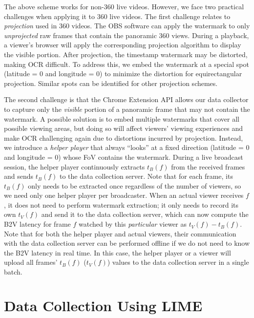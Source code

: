 The above scheme works for non-360\degree{} live videos. However,
we face two practical challenges when applying it to 360\degree{} live videos.
The first challenge relates to \emph{projection} used in 360\degree{} videos.
The OBS software can apply the watermark to only \emph{unprojected}
raw frames that contain the panoramic 360\degree{} views. During a playback,
a viewer's browser will apply the corresponding projection algorithm to display the visible portion. After projection, the timestamp watermark may be distorted, making OCR difficult.
%
To address this, we embed the watermark at a special spot (latitude = 0\degree{} and longitude = 0\degree{}) to minimize the distortion for equirectangular projection. Similar spots can be identified for other projection schemes.

The second challenge is that the Chrome Extension API allows our data collector to capture only the \emph{visible} portion of a panoramic frame that may not contain the watermark. A possible solution is to embed multiple watermarks that cover all possible viewing areas, but doing so will affect viewers' viewing experiences and make OCR challenging again due to distortions incurred by projection.
%
Instead, we introduce a \emph{helper player} that always ``looks'' at a fixed direction (\ie latitude = 0\degree{} and longitude = 0\degree{}) whose FoV contains the watermark.
%
During a live broadcast session, the helper player
continuously extracts $t_B(f)$ from the received frames
and sends $t_B(f)$ to the data collection server.
%
Note that for each frame, its $t_B(f)$ only needs to be extracted once
regardless of the number of viewers, so we need only one helper player per broadcaster.
%
When an actual viewer receives $f$, it does not need to perform watermark extraction; it
only needs to record its own $t_V(f)$ and send it to the data collection server, which can now compute the B2V latency for frame $f$ watched by this \emph{particular} viewer as $t_V(f) - t_B(f)$. Note that for both the helper player and actual viewers, their
communication with the data collection server can be performed offline if we do not need to know the B2V latency in real time. In this case, the helper player or a viewer will upload all frames' $t_B(f)$ ($t_V(f)$) values to the data collection server in a single batch.


\section{Data Collection Using LIME}
\label{sec:lime_data_collection}

